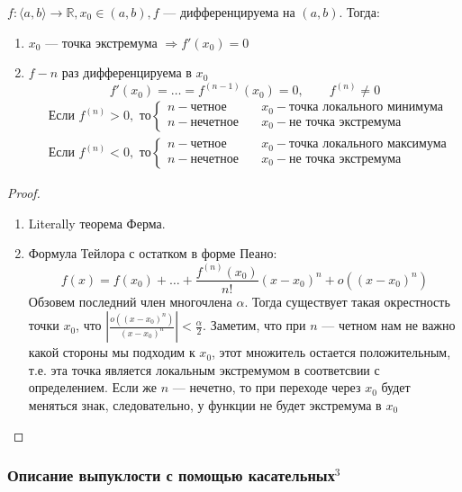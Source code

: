 \documentclass{article}
\begin{document}
$f:\langle a, b\rangle \to \mathbb{R}, x_0 \in (a, b), f$ --- дифференцируема на $(a, b)$. Тогда:
\begin{enumerate}
\item $x_0$ --- точка экстремума $\Rightarrow f'(x_0) = 0$
\item $f - n$ раз дифференцируема в $x_0$
\begin{equation*}
f'(x_0) = \ldots = f^{(n-1)}(x_0) = 0, \qquad f^{(n)} \neq 0
\end{equation*}
\begin{align*}
&\text{Если } f^{(n)} > 0, \text{ то}
\begin{cases}
n  - \text{четное} &\quad x_0 - \text{точка локального минимума}\\
n  - \text{нечетное} &\quad x_0 - \text{не точка экстремума}
\end{cases}
\\
&\text{Если } f^{(n)} < 0, \text{ то}
\begin{cases}
n  - \text{четное} &\quad x_0 - \text{точка локального максимума}\\
n  - \text{нечетное} &\quad x_0 - \text{не точка экстремума}
\end{cases}
\end{align*}
\end{enumerate}

\begin{proof}
\item
\begin{enumerate}
\item Literally теорема Ферма.
\item Формула Тейлора с остатком в форме Пеано:
\begin{equation*}
f(x) = f(x_0) + \ldots + \frac{f^{(n)}(x_0)} {n!} (x - x_0)^n + o((x - x_0)^n)
\end{equation*}
Обзовем последний член многочлена $\alpha$. Тогда существует такая окрестность точки $x_0$, что $\left|\frac{o((x - x_0)^n)} {(x-x_0)^n}\right| < \frac{\alpha} {2}$. Заметим, что при $n$ --- четном нам не важно   какой стороны мы подходим к $x_0$, этот множитель остается положительным, т.е. эта точка является локальным экстремумом в соответсвии с определением. Если же $n$ --- нечетно, то при переходе через $x_0$ будет меняться знак, следовательно, у функции не будет экстремума в $x_0$
\end{enumerate}
\end{proof}


\subsubsection{Описание выпуклости с помощью касательных\texorpdfstring{$^3$}{}}
\end{document}

